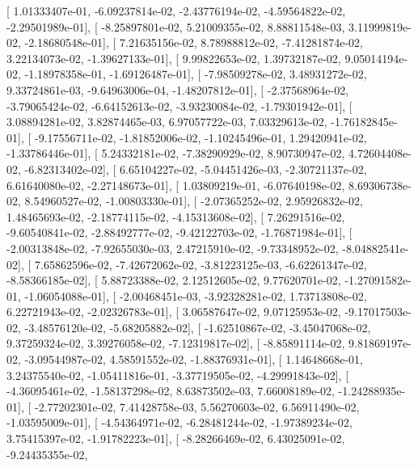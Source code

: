 \documentclass{article}
\begin{document}
       [  1.01333407e-01,  -6.09237814e-02,  -2.43776194e-02,
         -4.59564822e-02,  -2.29501989e-01],
       [ -8.25897801e-02,   5.21009355e-02,   8.88811548e-03,
          3.11999819e-02,  -2.18680548e-01],
       [  7.21635156e-02,   8.78988812e-02,  -7.41281874e-02,
          3.22134073e-02,  -1.39627133e-01],
       [  9.99822653e-02,   1.39732187e-02,   9.05014194e-02,
         -1.18978358e-01,  -1.69126487e-01],
       [ -7.98509278e-02,   3.48931272e-02,   9.33724861e-03,
         -9.64963006e-04,  -1.48207812e-01],
       [ -2.37568964e-02,  -3.79065424e-02,  -6.64152613e-02,
         -3.93230084e-02,  -1.79301942e-01],
       [  3.08894281e-02,   3.82874465e-03,   6.97057722e-03,
          7.03329613e-02,  -1.76182845e-01],
       [ -9.17556711e-02,  -1.81852006e-02,  -1.10245496e-01,
          1.29420941e-02,  -1.33786446e-01],
       [  5.24332181e-02,  -7.38290929e-02,   8.90730947e-02,
          4.72604408e-02,  -6.82313402e-02],
       [  6.65104227e-02,  -5.04451426e-03,  -2.30721137e-02,
          6.61640080e-02,  -2.27148673e-01],
       [  1.03809219e-01,  -6.07640198e-02,   8.69306738e-02,
          8.54960527e-02,  -1.00803330e-01],
       [ -2.07365252e-02,   2.95926832e-02,   1.48465693e-02,
         -2.18774115e-02,  -4.15313608e-02],
       [  7.26291516e-02,  -9.60540841e-02,  -2.88492777e-02,
         -9.42122703e-02,  -1.76871984e-01],
       [ -2.00313848e-02,  -7.92655030e-03,   2.47215910e-02,
         -9.73348952e-02,  -8.04882541e-02],
       [  7.65862596e-02,  -7.42672062e-02,  -3.81223125e-03,
         -6.62261347e-02,  -8.58366185e-02],
       [  5.88723388e-02,   2.12512605e-02,   9.77620701e-02,
         -1.27091582e-01,  -1.06054088e-01],
       [ -2.00468451e-03,  -3.92328281e-02,   1.73713808e-02,
          6.22721943e-02,  -2.02326783e-01],
       [  3.06587647e-02,   9.07125953e-02,  -9.17017503e-02,
         -3.48576120e-02,  -5.68205882e-02],
       [ -1.62510867e-02,  -3.45047068e-02,   9.37259324e-02,
          3.39276058e-02,  -7.12319817e-02],
       [ -8.85891114e-02,   9.81869197e-02,  -3.09544987e-02,
          4.58591552e-02,  -1.88376931e-01],
       [  1.14648668e-01,   3.24375540e-02,  -1.05411816e-01,
         -3.37719505e-02,  -4.29991843e-02],
       [ -4.36095461e-02,  -1.58137298e-02,   8.63873502e-03,
          7.66008189e-02,  -1.24288935e-01],
       [ -2.77202301e-02,   7.41428758e-03,   5.56270603e-02,
          6.56911490e-02,  -1.03595009e-01],
       [ -4.54364971e-02,  -6.28481244e-02,  -1.97389234e-02,
          3.75415397e-02,  -1.91782223e-01],
       [ -8.28266469e-02,   6.43025091e-02,  -9.24435355e-02,
\end{document}
